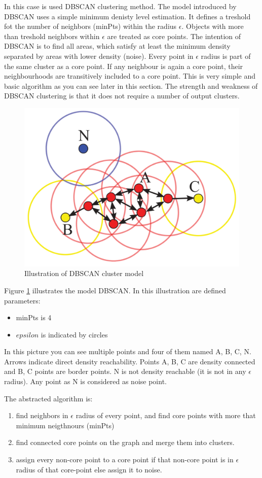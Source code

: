 	In this case is used DBSCAN clustering method\cite{Schubert:2017:DRR:3129336.3068335}.
	The model introduced by DBSCAN uses a simple minimum denisty level estimation.
	It defines a treshold fot the number of neighbors (minPts) within the radius $\epsilon$.
	Objects with more than treshold neighbors within $\epsilon$ are treated as core points.
	The intention of DBSCAN is to find all areas, which satisfy at least the minimum density separated by areas with lower density (noise).
	Every point in $\epsilon$ radius is part of the same cluster as a core point.
	If any neighbour is again a core point, their neighbourhoods are transitively included to a core point.
	This is very simple and basic algorithm as you can see later in this section.
	The strength and weakness of DBSCAN clustering is that it does not require a number of output clusters.

	\begin{figure}[h]
		\centering
		\includegraphics[width=0.5\linewidth]{obrazky-figures/dbscan}
		\caption{Illustration of DBSCAN cluster model}
		\label{dbscan_ilustration}
	\end{figure}

	Figure \ref{dbscan_ilustration} illustrates the model DBSCAN.
	In this illustration are defined parameters:
	\begin{itemize}
			\item minPts is 4
			\item $epsilon$ is indicated by circles
	\end{itemize}

	In this picture you can see multiple points and four of them named A, B, C, N.
	Arrows indicate direct density reachability. Points A, B, C are density connected and B, C points are border points.
	N is not density reachable (it is not in any $\epsilon$ radius). Any point as N is considered as noise point.

	The abstracted algorithm is:\nopagebreak
	\begin{enumerate}
			\item find neighbors in $\epsilon$ radius of every point, and find core points with more that minimum neigthnours (minPts)
			\item find connected core points on the graph and merge them into clusters.
			\item assign every non-core point to a core point if that non-core point is in $\epsilon$ radius of that core-point else assign it to noise.
	\end{enumerate}

